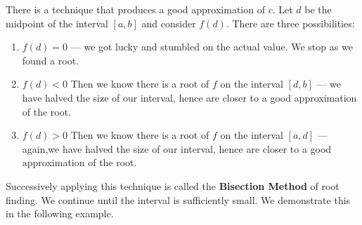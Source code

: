 There is a technique that produces a good approximation of $c$. Let $d$ be the midpoint of the interval $[a,b]$ and consider $f(d)$. There are three possibilities:
\begin{enumerate}
	\item	$f(d) = 0$ --- we got lucky and stumbled on the actual value. We stop as we found a root.
	\item	$f(d) <0$ Then we know there is a root of $f$ on the interval $[d,b]$ --- we have halved the size of our interval, hence are closer to a good approximation of the root.
	\item	$f(d) >0$ Then we know there is a root of $f$ on the interval $[a,d]$ --- again,we have halved the size of our interval, hence are closer to a good approximation of the root.
\end{enumerate}

Successively applying this technique is called the \textbf{Bisection Method}  of root finding. We continue until the interval is sufficiently small. We demonstrate this in the following example.


